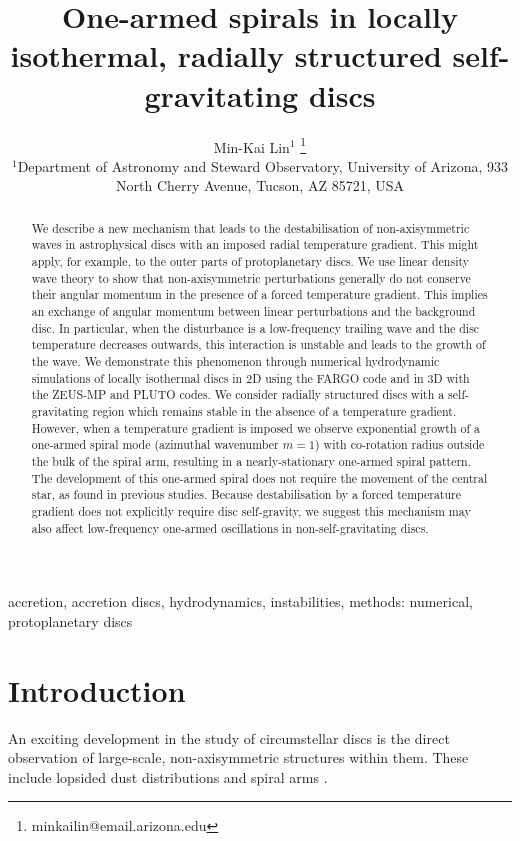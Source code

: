 \documentclass[useAMS,usenatbib]{mn2e}
\title[One-armed spirals]{One-armed spirals in 
  locally isothermal, radially structured self-gravitating discs}
\author[Lin]{Min-Kai Lin$^{1}$
  \thanks{ minkailin@email.arizona.edu} \\ 
  $^1$Department of Astronomy and Steward Observatory, University of
  Arizona, 933 North Cherry Avenue, Tucson, AZ 85721, USA 
}
\begin{document}
\maketitle
\begin{abstract} 
   We describe a new mechanism that leads to the destabilisation of
 non-axisymmetric waves in astrophysical discs with 
 an imposed radial temperature gradient. This might apply, for
 example, to the outer parts of protoplanetary discs. We use linear
 density wave theory 
 to show that non-axisymmetric perturbations generally do not conserve
 their angular momentum in the presence of a forced temperature
 gradient. This implies an exchange of angular momentum 
 between linear perturbations and the background disc. In particular, 
 when the disturbance is a low-frequency 
 trailing wave and the disc temperature decreases outwards, this 
 interaction is unstable and leads to the growth of the wave.  
 We demonstrate this phenomenon through numerical hydrodynamic
 simulations of locally isothermal discs in 2D using the FARGO
 code and in 3D with  the ZEUS-MP and PLUTO codes.  We consider
 radially structured discs with a self-gravitating region which remains
 stable in the absence of a temperature gradient. However,
 when a temperature gradient is imposed we observe exponential growth of a one-armed  
 spiral mode (azimuthal wavenumber $m=1$) with co-rotation radius 
 outside the bulk of the spiral arm, resulting in a nearly-stationary
 one-armed spiral pattern.  The development of this one-armed 
 spiral does not require the movement of the central star, as found in previous studies. 
 Because destabilisation by a forced temperature gradient does 
 not explicitly require disc self-gravity, we suggest this mechanism may also
 affect low-frequency one-armed oscillations in non-self-gravitating
 discs. 

\end{abstract}



\begin{keywords}
  accretion, accretion discs, hydrodynamics, instabilities, methods: numerical, protoplanetary discs 
\end{keywords}

\section{Introduction}\label{intro}
An exciting development in the study of circumstellar 
discs is the direct observation of large-scale, non-axisymmetric
structures within them. These
include lopsided dust distributions 
\citep{marel13,fukagawa13,casassus13,isella13,perez14,follette14,plas14} and
spiral arms 
\citep{hashimoto11,muto12,boccaletti14,grady13,christiaens14,avenhaus14}. 
\end{document}
